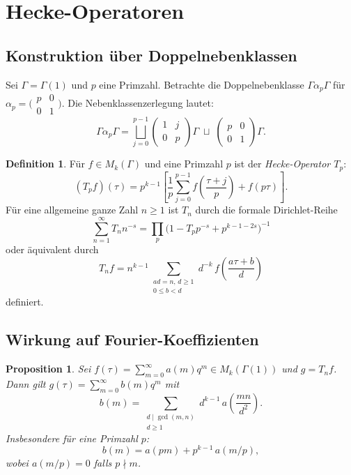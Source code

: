 \documentclass[12pt,a4paper]{amsart}
\newtheorem{proposition}[theorem]{Proposition}
\theoremstyle{definition}
\newtheorem{definition}[theorem]{Definition}
\begin{document}
\section{Hecke-Operatoren}

\subsection{Konstruktion \"uber Doppelnebenklassen}

Sei $\Gamma = \Gamma(1)$ und $p$ eine Primzahl. Betrachte die Doppelnebenklasse
$\Gamma\alpha_p\Gamma$ f\"ur $\alpha_p = \bigl(\begin{smallmatrix}p&0\\0&1\end{smallmatrix}\bigr)$.
Die Nebenklassenzerlegung lautet:
\[
  \Gamma\alpha_p\Gamma = \bigsqcup_{j=0}^{p-1}
  \begin{pmatrix}1&j\\0&p\end{pmatrix}\Gamma
  \;\sqcup\;
  \begin{pmatrix}p&0\\0&1\end{pmatrix}\Gamma.
\]

\begin{definition}
  F\"ur $f \in M_k(\Gamma)$ und eine Primzahl $p$ ist der \emph{Hecke-Operator $T_p$}:
  \[
    (T_p f)(\tau) = p^{k-1} \left[
      \frac{1}{p}\sum_{j=0}^{p-1} f\!\left(\frac{\tau+j}{p}\right)
      + f(p\tau)
    \right].
  \]
  F\"ur eine allgemeine ganze Zahl $n \ge 1$ ist $T_n$ durch die formale
  Dirichlet-Reihe
  \[
    \sum_{n=1}^{\infty} T_n n^{-s} =
    \prod_{p}\bigl(1 - T_p p^{-s} + p^{k-1-2s}\bigr)^{-1}
  \]
  oder \"aquivalent durch
  \[
    T_n f = n^{k-1} \sum_{\substack{ad=n,\,d\ge 1 \\ 0 \le b < d}}
    d^{-k}\, f\!\left(\frac{a\tau+b}{d}\right)
  \]
  definiert.
\end{definition}

\subsection{Wirkung auf Fourier-Koeffizienten}

\begin{proposition}\label{prop:hecke-fourier}
  Sei $f(\tau) = \sum_{m=0}^{\infty} a(m) q^m \in M_k(\Gamma(1))$ und
  $g = T_n f$. Dann gilt $g(\tau) = \sum_{m=0}^{\infty} b(m) q^m$ mit
  \[
    b(m) = \sum_{\substack{d \mid \gcd(m,n) \\ d \ge 1}} d^{k-1}\,
    a\!\left(\frac{mn}{d^2}\right).
  \]
  Insbesondere f\"ur eine Primzahl $p$:
  \[
    b(m) = a(pm) + p^{k-1}\,a(m/p),
  \]
  wobei $a(m/p) = 0$ falls $p \nmid m$.
\end{proposition}
\end{document}
